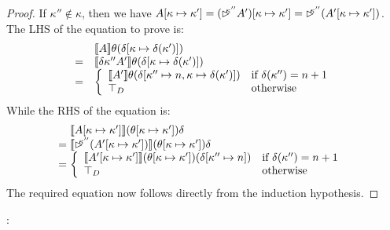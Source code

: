 \begin{proof}
  If $\kappa'' \not\in \kappa$, then we have $A[\kappa \mapsto
  \kappa'] = (\mathord{\rhd\kern-0.4em^{\kappa''}} A')[\kappa \mapsto \kappa'] =
  \mathord{\rhd\kern-0.4em^{\kappa''}} (A'[\kappa \mapsto \kappa'])$. The LHS of the
  equation to prove is:
  \begin{displaymath}
    \begin{array}{cl}
      & \llbracket A \rrbracket\theta (\delta[\kappa \mapsto \delta(\kappa')]) \\
      =& \llbracket \delta{\kappa''}A' \rrbracket \theta (\delta[\kappa \mapsto \delta(\kappa')]) \\
      =&\left\{
        \begin{array}{ll}
          \llbracket A' \rrbracket\theta(\delta[\kappa'' \mapsto n, \kappa \mapsto \delta(\kappa')]) & \textrm{if }\delta(\kappa'') = n + 1 \\
          \top_D & \textrm{otherwise}
        \end{array}
      \right.
    \end{array}
  \end{displaymath}
  While the RHS of the equation is:
  \begin{displaymath}
    \begin{array}{@{}c@{\hspace{0.3em}}l}
      & \sem{A[\kappa \mapsto \kappa']}(\theta[\kappa\mapsto\kappa'])\delta \\
      =&\sem{\delay{\kappa''}(A'[\kappa\mapsto\kappa'])}(\theta[\kappa\mapsto\kappa'])\delta \\
      =&\left\{
        \begin{array}{ll}
          \sem{A'[\kappa\mapsto\kappa']}(\theta[\kappa\mapsto\kappa'])(\delta[\kappa'' \mapsto n]) & \textrm{if }\delta(\kappa'') = n + 1\\
          \top_D & \textrm{otherwise}
        \end{array}
      \right.
    \end{array}
  \end{displaymath}
  The required equation now follows directly from the induction
  hypothesis.
\end{proof}

:

